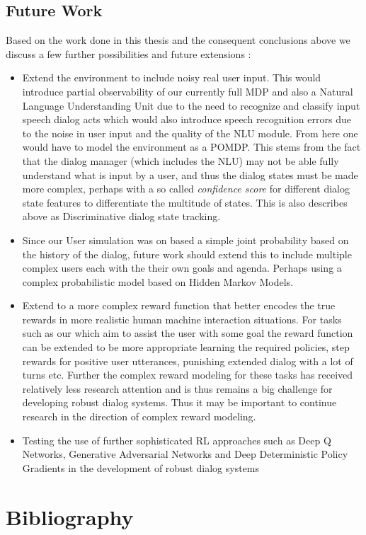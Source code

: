 \documentclass[14pt]{extarticle}
\numberwithin{equation}{section}
\begin{document}
\subsection{Future Work}
Based on the work done in this thesis and the consequent conclusions above we discuss a few further possibilities and future extensions :
\begin{itemize}
	\item Extend the environment to include noisy real user input. This would introduce partial observability of our currently full MDP and also a Natural Language Understanding Unit due to the need to recognize and classify input speech dialog acts which would also introduce speech recognition errors due to the noise in user input and the quality of the NLU module. From here one would have to model the environment as a POMDP\cite{Sutton-introRL}. This stems from the fact that the dialog manager (which includes the NLU) may not be able fully understand what is input by a user, and thus the dialog states must be made more complex, perhaps with a so called \textit{confidence score} for different dialog state features to differentiate the multitude of states. This is also describes above as Discriminative dialog state tracking.
	\item Since our User simulation was on based a simple joint probability based on the history of the dialog, future work should extend this to include multiple complex users each with the their own goals and agenda. Perhaps using a complex probabilistic model based on Hidden Markov Models.
	\item Extend to a more complex reward function that better encodes the true rewards in more realistic human machine interaction situations. For tasks such as our which aim to assist the user with some goal the reward function can be extended to be more appropriate learning the required policies, step rewards for positive user utterances, punishing extended dialog with a lot of turns etc. Further the complex reward modeling for these tasks has received relatively less research attention and is thus remains a big challenge for developing robust dialog systems. Thus it may be important to continue research in the direction of complex reward modeling.
	\item Testing the use of further sophisticated RL approaches such as Deep Q Networks, Generative Adversarial Networks and Deep Deterministic Policy Gradients in the development of robust dialog systems
\end{itemize}

	\clearpage
	\section[References]{Bibliography}
	
	
\end{document}
